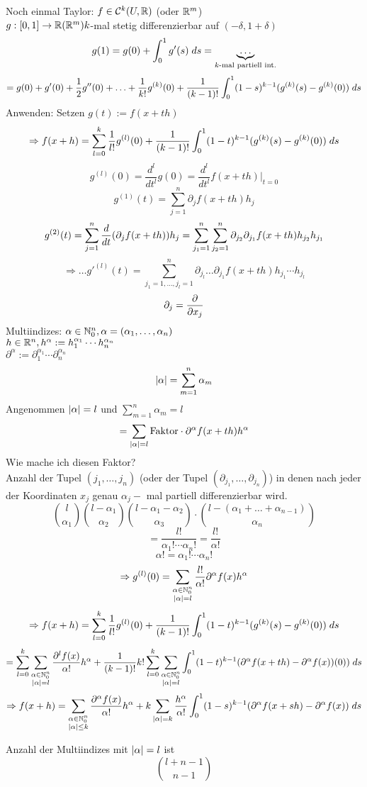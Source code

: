 \documentclass[../ana2.tex]{subfiles}
\begin{document}
Noch einmal Taylor: 
\( f \in \mathcal{C}^k(U, \R) \) (oder \( \R^m \)) \\
\(\abb{g}{[0,1]}{\R} (\R^m) k\)-mal stetig differenzierbar auf \((-\delta, 1+\delta)\)
\[ g(1) = g(0)+\integralx{g'(s)}{0}{1}{s} = \underbrace{\ldots}_{k\text{-mal partiell int.}} \]
\[ = g(0)+g'(0)+\frac{1}{2}g''(0) + \ldots + \frac{1}{k!} g^{(k)}(0) + \frac{1}{(k-1)!}
\integralx{(1-s)^{k-1} (g^{(k)}(s)-g^{(k)}(0))}{0}{1}{s} \]
Anwenden:
Setzen \( g(t) := f(x + th) \)
\[ \Rightarrow f(x+h) = \sum_{l=0}^k \frac{1}{l!} g^{(l)}(0) 
+ \frac{1}{(k-1)!} \integralx{(1-t)^{k-1} (g^{(k)}(s) - g^{(k)}(0)) }{0}{1}{s} \]
\[ g^{(l)}(0) = \frac{d^l}{dt^l}g(0) = \frac{d^l}{dt^l} f(x+th) \vert_{t=0} \]
\[ g^{(1)}(t) = \sum_{j=1}^n \partial_j f(x+th) h_j \]
\[ g^{(2)}(t) = \sum_{j=1}^n \ddx{t} (\partial_j f(x+th)) h_j 
= \sum_{j_1=1}^n \sum_{j_2 = 1}^n \partial_{j_2} 
\partial_{j_1} f(x + th) h_{j_2} h_{j_1} \]
\[ \Rightarrow \ldots g'^{(l)}(t) = \sum_{j_1=1,\ldots, j_l =1}^n 
\partial_{j_l} \ldots \partial_{j_1} f(x+th) h_{j_1}\cdots h_{j_l} \]
\[ \partial_j = \ddxpartial{x_j} \]
Multiindizes: \(\alpha \in \N_0^n, \alpha = (\alpha_1, \ldots, \alpha_n)\)\\
\( h \in \R^n, h^\alpha := h_1^{\alpha_1} \cdots h_n^{\alpha_n} \)\\
\( \partial^\alpha := \partial_1^{\alpha_1} \cdots \partial_n^{\alpha_n} \)\\
\[ \abs{\alpha} = \sum_{m=1}^n \alpha_m \]
Angenommen \(\abs{\alpha} = l\) und \(\sum_{m=1}^n \alpha_m = l\)
\[ = \sum_{\abs{\alpha} = l} \text{Faktor} \cdot \partial^\alpha f(x+th)h^\alpha \]
Wie mache ich diesen Faktor?\\
Anzahl der Tupel \((j_1, \ldots, j_n)\) (oder der Tupel \((\partial_{j_1}, \ldots, \partial_{j_n})\))
in denen nach jeder der Koordinaten \(x_j\) genau \(\alpha_j-\) mal partiell differenzierbar wird.  
\[ \binom{l}{\alpha_1}\binom{l-\alpha_1}{\alpha_2}\binom{l-\alpha_1-\alpha_2}{\alpha_3}
\cdot \binom{l-(\alpha_1+\ldots+\alpha_{n-1})}{\alpha_n} \]
\[ = \frac{l!}{\alpha_1!\cdots \alpha_n!} = \frac{l!}{\alpha!} \]
\[ \alpha! = \alpha_1!\cdots \alpha_n!  \]
\[ \Rightarrow g^{(l)}(0) = \sum_{\substack{\alpha \in \N_0^n \\ \abs{\alpha} = l}}
\frac{l!}{\alpha!} \partial^\alpha f(x) h^\alpha \]
\[ \Rightarrow f(x+h) = \sum_{l=0}^k \frac{1}{l!} g^{(l)}(0) 
+ \frac{1}{(k-1)!} \integralx{ (1-t)^{k-1} (g^{(k)}(s) - g^{(k)}(0)) }{0}{1}{s} \]
\[ = \sum_{l=0}^k \sum_{\substack{\alpha \in \N_0^n \\ \abs{\alpha} = l}}
\frac{\partial^l f(x)}{\alpha!}h^\alpha + \frac{1}{(k-1)!} k!
\sum_{l=0}^k \sum_{\substack{\alpha \in \N_0^n \\ \abs{\alpha} = l}}
\integralx{(1-t)^{k-1} (\partial^\alpha f(x+th)-\partial^\alpha f(x))(0))}{0}{1}{s} \]
\[ \Rightarrow f(x + h) = \sum_{\substack{\alpha \in \N_0^n \\ \abs{\alpha} \leq k}} 
\frac{ \partial^\alpha f(x) }{\alpha!} h^\alpha 
+ k \sum_{\abs{\alpha} = k} \frac{h^\alpha}{\alpha!} 
\integralx{(1-s)^{k-1} (\partial^\alpha f(x + sh) - \partial^\alpha f(x)) }{0}{1}{s} \]
\begin{bem}
    Anzahl der Multiindizes mit \(\abs{\alpha} = l\) ist 
    \[ \binom{l+n-1}{n-1} \]
\end{bem}
\end{document}

